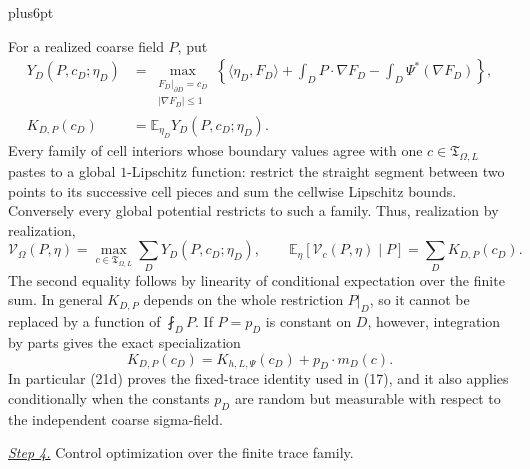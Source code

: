 \documentclass[11pt,reqno]{amsart}
\makeatletter
\theoremstyle{plain}
\theoremstyle{definition}
\theoremstyle{remark}
\renewenvironment{proof}[1][\proofname]{%
  \par
  \pushQED{\qed}%
  \normalfont
  \topsep6pt plus6pt\relax
  \trivlist
  \item[\hskip\labelsep\slshape #1\@addpunct{.}]%
  \ignorespaces
}{%
  \popQED
  \endtrivlist
  \@endpefalse
}
\DeclareRobustCommand{\qed}{%
  \leavevmode\unskip\penalty9999\hbox{}\nobreak
  \ifmmode
    \makebox[0pt][l]{\qquad\hbox{\qedsymbol}}%
  \else
    \qquad\hbox{\qedsymbol}%
  \fi
}
\renewcommand{\qedsymbol}{\rule[.47pt]{4pt}{6pt}}
\numberwithin{equation}{section}
\newcommand{\1}{\mathbf 1}
\makeatother
\begin{document}
\begin{proof}
For a realized coarse field $P$, put
\begin{equation*}
\begin{aligned}
Y_ D(P,c_ D;\eta_ D)&=
\max_ {\substack{F_ D|_ {\partial D}=c_ D\\|\nabla F_ D|\leq1}}
\left\{\langle\eta_ D,F_ D\rangle+
\int_ DP\cdot\nabla F_ D-\int_ D\Psi^*(\nabla F_ D)\right\},\\
K_ {D,P}(c_ D)&=\mathbb E_ {\eta_ D}Y_ D(P,c_ D;\eta_ D).
\end{aligned}
\end{equation*}
Every family of cell interiors whose boundary values agree with one
$c\in\mathfrak T_{\Omega,L}$ pastes to a global $1$-Lipschitz
function: restrict the straight segment between
two points to its successive cell pieces and sum the cellwise Lipschitz
bounds.  Conversely every global potential restricts to such a family.
Thus, realization by realization,
\begin{equation}
\mathcal V_ \Omega(P,\eta)
=\max_ {c\in\mathfrak T_ {\Omega,L}}\sum_ DY_ D(P,c_ D;\eta_ D),
\qquad
\mathbb E_ \eta[\mathcal V_ c(P,\eta)\mid P]
=\sum_ DK_ {D,P}(c_ D).
\tag{21c}
\end{equation}
The second equality follows by linearity of conditional expectation
over the finite sum.  In general $K_ {D,P}$ depends on the whole restriction
$P|_ D$, so it cannot be replaced by a function of $\fint_ DP$.
If $P=p_ D$ is constant on $D$, however, integration by parts gives
the exact specialization
\begin{equation}
K_ {D,P}(c_ D)=K_ {h,L,\Psi}(c_ D)+p_ D\cdot m_ D(c).
\tag{21d}
\end{equation}
In particular (21d) proves the fixed-trace identity used in (17), and
it also applies conditionally when the constants $p_ D$ are random but
measurable with respect to the independent coarse sigma-field.

\smallskip\noindent
\underline{\textit{Step 4.}} Control optimization over the finite trace family.


\end{proof}
\end{document}
